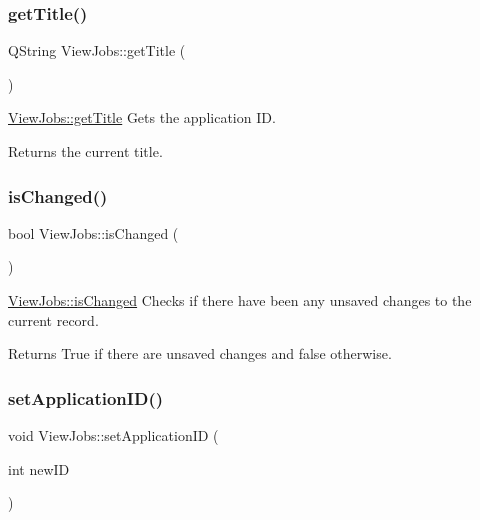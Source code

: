 \subsubsection{\texorpdfstring{get\+Title()}{getTitle()}}
{\footnotesize\ttfamily Q\+String View\+Jobs\+::get\+Title (\begin{DoxyParamCaption}{ }\end{DoxyParamCaption})}



\hyperlink{class_view_jobs_ae78f119d37c77a9e3e457ecfd78d7de3}{View\+Jobs\+::get\+Title} Gets the application ID. 

\begin{DoxyReturn}{Returns}
the current title. 
\end{DoxyReturn}
\mbox{\label{class_view_jobs_a5f75b45d28ce7f4a8050ce9ce0f44350}} 
\subsubsection{\texorpdfstring{is\+Changed()}{isChanged()}}
{\footnotesize\ttfamily bool View\+Jobs\+::is\+Changed (\begin{DoxyParamCaption}{ }\end{DoxyParamCaption})}



\hyperlink{class_view_jobs_a5f75b45d28ce7f4a8050ce9ce0f44350}{View\+Jobs\+::is\+Changed} Checks if there have been any unsaved changes to the current record. 

\begin{DoxyReturn}{Returns}
True if there are unsaved changes and false otherwise. 
\end{DoxyReturn}
\mbox{\label{class_view_jobs_acd43a8c32ab9bca7e40ecc99e51da9b8}} 
\subsubsection{\texorpdfstring{set\+Application\+I\+D()}{setApplicationID()}}
{\footnotesize\ttfamily void View\+Jobs\+::set\+Application\+ID (\begin{DoxyParamCaption}\item[{int}]{new\+ID }\end{DoxyParamCaption})}



